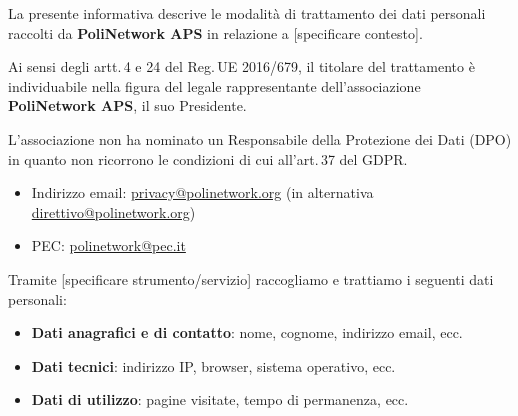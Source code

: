 \documentclass[legal]{../core/polinetwork}
\begin{document}
\thispagestyle{firstpage}

\pnMakeHeader

\pnMakeMetadata


La presente informativa descrive le modalità di trattamento dei dati personali
raccolti da \textbf{PoliNetwork APS} in relazione a [specificare contesto].


Ai sensi degli artt.\,4 e 24 del Reg.\,UE 2016/679, il titolare del trattamento
è individuabile nella figura del legale rappresentante dell'associazione
\textbf{PoliNetwork APS}, il suo Presidente.

L'associazione non ha nominato un Responsabile della Protezione dei Dati (DPO)
in quanto non ricorrono le condizioni di cui all'art.\,37 del GDPR.


\begin{itemize}
  \item Indirizzo email: \href{mailto:privacy@polinetwork.org}{privacy@polinetwork.org}
        (in alternativa \href{mailto:direttivo@polinetwork.org}{direttivo@polinetwork.org})
  \item PEC: \href{mailto:polinetwork@pec.it}{polinetwork@pec.it}
\end{itemize}


Tramite [specificare strumento/servizio] raccogliamo e trattiamo i seguenti dati personali:

\begin{itemize}
  \item \textbf{Dati anagrafici e di contatto}: nome, cognome, indirizzo email, ecc.
  \item \textbf{Dati tecnici}: indirizzo IP, browser, sistema operativo, ecc.
  \item \textbf{Dati di utilizzo}: pagine visitate, tempo di permanenza, ecc.
\end{itemize}

\end{document}
